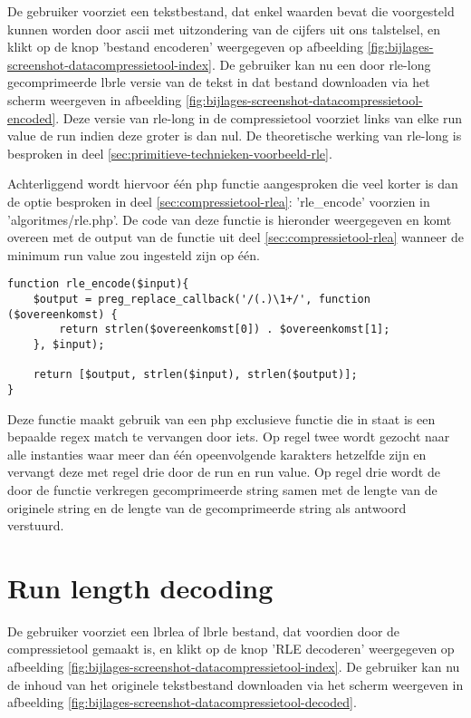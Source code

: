 De gebruiker voorziet een tekstbestand, dat enkel waarden bevat die voorgesteld kunnen worden door \gls{ascii} met uitzondering van de cijfers uit ons talstelsel, en klikt op de knop 'bestand encoderen' weergegeven op afbeelding \ref{fig:bijlages-screenshot-datacompressietool-index}. De gebruiker kan nu een door \gls{rle-long} gecomprimeerde \gls{lbrle} versie van de tekst in dat bestand downloaden via het scherm weergeven in afbeelding \ref{fig:bijlages-screenshot-datacompressietool-encoded}. Deze versie van \gls{rle-long} in de \gls{compressietool} voorziet links van elke run value de run indien deze groter is dan nul. De theoretische werking van \gls{rle-long} is besproken in deel \ref{sec:primitieve-technieken-voorbeeld-rle}.

Achterliggend wordt hiervoor één \gls{php} functie aangesproken die veel korter is dan de optie besproken in deel \ref{sec:compressietool-rlea}: 'rle\_encode' voorzien in 'algoritmes/rle.php'. De code van deze functie is hieronder weergegeven en komt overeen met de output van de functie uit deel \ref{sec:compressietool-rlea} wanneer de minimum run value zou ingesteld zijn op één.

\begin{lstlisting}
function rle_encode($input){
	$output = preg_replace_callback('/(.)\1+/', function ($overeenkomst) {
		return strlen($overeenkomst[0]) . $overeenkomst[1];
	}, $input);
	
	return [$output, strlen($input), strlen($output)];
}
\end{lstlisting}

Deze functie maakt gebruik van een \gls{php} exclusieve functie die in staat is een bepaalde \gls{regex} match te vervangen door iets. Op regel twee wordt gezocht naar alle instanties waar meer dan één opeenvolgende karakters hetzelfde zijn en vervangt deze met regel drie door de run en run value. Op regel drie wordt de door de functie verkregen gecomprimeerde \gls{string} samen met de lengte van de originele \gls{string} en de lengte van de gecomprimeerde \gls{string} als antwoord verstuurd.

\section{Run length decoding}
\label{sec:compressietool-rle-decoding}

De gebruiker voorziet een \gls{lbrlea} of \gls{lbrle} bestand, dat voordien door de \gls{compressietool} gemaakt is, en klikt op de knop 'RLE decoderen' weergegeven op afbeelding \ref{fig:bijlages-screenshot-datacompressietool-index}. De gebruiker kan nu de inhoud van het originele tekstbestand downloaden via het scherm weergeven in afbeelding \ref{fig:bijlages-screenshot-datacompressietool-decoded}.

